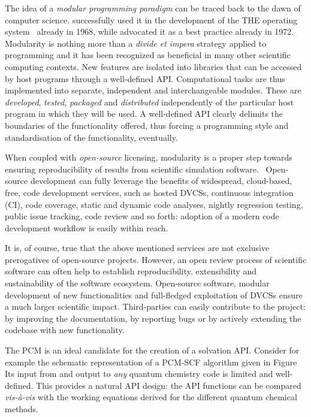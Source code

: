 The idea of a \emph{modular programming paradigm} can be traced back to
the dawn of computer science. \citeauthor{Dijkstra1968-zp}
successfully used it in the development of the THE operating
system~\autocite{Dijkstra1968-zp} already in 1968, while
\citeauthor{Parnas1972-im} advocated it as a best practice already in
1972.~\autocite{Parnas1972-im}
Modularity is nothing more than a \emph{divide et impera} strategy
applied to programming and it has been recognized as beneficial in many
other scientific computing contexts.
New features are isolated into libraries that can be accessed by host
programs through a well-defined \ac{API}.
Computational tasks are thus implemented into separate, independent and
interchangeable modules. These are \emph{developed}, \emph{tested},
\emph{packaged} and \emph{distributed}
independently of the particular host program in which they will be
used.
A well-defined \ac{API} clearly delimits the boundaries of the functionality
offered, thus forcing a programming style and standardisation of the
functionality, eventually.~\autocite{Reddy2011-sd}

When coupled with \emph{open-source} licensing, modularity is a proper
step towards ensuring reproducibility of results from scientific
simulation software.~\autocite{Gezelter2015-gz, Krylov2015-fs,
Jacob2016-oq}
Open-source development can fully leverage the benefits of widespread,
cloud-based, free, code development services, such as hosted \acp{DVCS},
continuous integration (CI), code coverage, static and dynamic code
analyses, nightly regression testing, public issue tracking, code review
and so forth: adoption of a modern code development workflow is easily
within reach.

It is, of course, true that the above mentioned services are not
exclusive prerogatives of open-source projects. However, an open review
process of scientific software can often help to establish
reproducibility, extensibility and sustainability of the software
ecosystem.
Open-source software, modular development of new functionalities and
full-fledged exploitation of \acsp{DVCS} ensure a much larger scientific
impact. Third-parties can easily contribute to the project: by improving
the documentation, by reporting bugs or by actively extending the
codebase with new functionality.

The \acs{PCM} is an ideal candidate for the creation of a solvation
\acs{API}.
Consider for example the schematic representation of a
\acs{PCM}-\acs{SCF} algorithm given in Figure
Its input from and output to \emph{any} quantum chemistry code is
limited and well-defined.
This provides a natural \acs{API} design: the \acs{API} functions can be compared
\emph{vis-à-vis} with the working equations derived for the different
quantum chemical methods.

